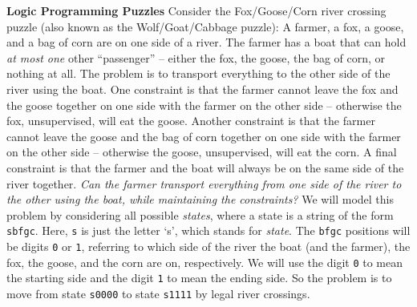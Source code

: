 \begin{minipage}[t]{\sw}
\slidenumber
\LARGE
{\bf Logic Programming Puzzles}\exx
Consider the Fox/Goose/Corn river crossing puzzle
(also known as the Wolf/Goat/Cabbage puzzle):\exx
A farmer, a fox, a goose, and a bag of corn are
on one side of a river.
The farmer has a boat that can hold {\em at most one} other ``passenger'' --
either the fox, the goose, the bag of corn, or nothing at all.
The problem is to transport everything
to the other side of the river using the boat.
One constraint is that the farmer cannot
leave the fox and the goose together on one side
with the farmer on the other side --
otherwise the fox, unsupervised, will eat the goose.
Another constraint is that the farmer cannot
leave the goose and the bag of corn together on one side
with the farmer on the other side --
otherwise the goose, unsupervised, will eat the corn.
A final constraint is that the farmer and the boat
will always be on the same side of the river together.
{\em Can the farmer transport everything
from one side of the river to the other
using the boat, while maintaining the constraints?}\exx
We will model this problem by considering all possible {\em states},
where a state is a string of the form \verb'sbfgc'.
Here, \verb's' is just the letter `s',
which stands for {\em state}.
The \verb'bfgc' positions will be digits \verb'0' or \verb'1',
referring to which side of the river the boat (and the farmer),
the fox, the goose, and the corn are on, respectively.
We will use the digit \verb'0' to mean the starting side
and the digit \verb'1' to mean the ending side.
So the problem is to move from state \verb's0000' to state \verb's1111'
by legal river crossings.\exx
\end{minipage}
